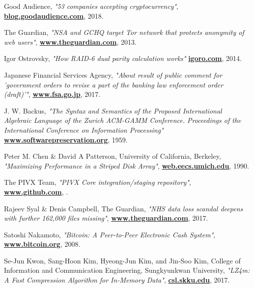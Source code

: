 \documentclass[10pt,a4paper,final]{article}
\let\oldhref\href
\renewcommand{\href}[2]{\oldhref{#1}{\bfseries#2}}
\begin{document}
\begin{thebibliography}{999}
	Good Audience,
	\emph{"53 companies accepting cryptocurrency"},
	\href{https://blog.goodaudience.com/companies-accepting-cryptocurrency-4e224d72e25b}{blog.goodaudience.com},
	2018.

	The Guardian,
	\emph{"NSA and GCHQ target Tor network that protects anonymity of web users"},
	\href{https://www.theguardian.com/world/2013/oct/04/nsa-gchq-attack-tor-network-encryption}{www.theguardian.com},
	2013.

	Igor Ostrovsky,
	\emph{"How RAID-6 dual parity calculation works"}
	\href{https://igoro.com/archive/how-raid-6-dual-parity-calculation-works/}{igoro.com},
	2014.

	Japanese Financial Services Agency,
	\emph{"About result of public comment for 'government orders to revise a part of the banking law enforcement order (draft)'"},
	\href{https://www.fsa.go.jp/news/28/ginkou/20170324-1.html}{www.fsa.go.jp},
	2017.

	J. W. Backus,
	\emph{"The Syntax and Semantics of the Proposed International Algebraic Language of the Zurich ACM-GAMM Conference. Proceedings of the International Conference on Information Processing"}
	\href{http://www.softwarepreservation.org/projects/ALGOL/paper/Backus-Syntax_and_Semantics_of_Proposed_IAL.pdf}{www.softwarepreservation.org},
	1959.

	Peter M. Chen \& David A Patterson, University of California, Berkeley,
	\emph{"Maximizing Performance in a Striped Disk Array"},
	\href{http://web.eecs.umich.edu/~pmchen/Rio/papers/chen90_1.pdf}{web.eecs.umich.edu},
	1990.

	The PIVX Team,
	\emph{"PIVX Core integration/staging repository"},
	\href{https://github.com/PIVX-Project/PIVX}{www.github.com},
	\the\year{}.

	Rajeev Syal \& Denis Campbell, The Guardian,
	\emph{"NHS data loss scandal deepens with further 162,000 files missing"},
	\href{https://www.theguardian.com/society/2017/oct/16/nhs-data-loss-scandal-deepens-with-162000-more-files-missing}{www.theguardian.com},
	2017.

	Satoshi Nakamoto,
	\emph{"Bitcoin: A Peer-to-Peer Electronic Cash System"},
	\href{http://www.bitcoin.org}{www.bitcoin.org},
	2008.

	Se-Jun Kwon, Sang-Hoon Kim, Hyeong-Jun Kim, and Jin-Soo Kim, College of Information and Communication Engineering, Sungkyunkwan University,
	\emph{"LZ4m: A Fast Compression Algorithm for In-Memory Data"},
	\href{http://csl.skku.edu/papers/icce17.pdf}{csl.skku.edu},
	2017.


\end{thebibliography}
\end{document}
